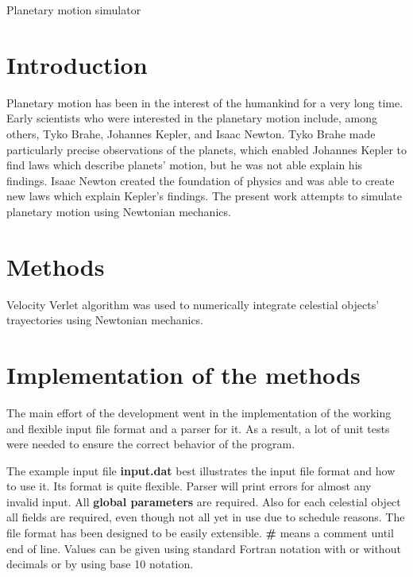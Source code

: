 \documentclass[12pt]{scrartcl}
\begin{document}
\begin{titlepage}
    \vspace*{\fill}
    \begin{center}
        \large
        Planetary motion simulator
        \normalsize
    \end{center}
    \vfill
\end{titlepage}
\date{}

\section*{Introduction}
Planetary motion has been in the interest of the humankind for a very long time. Early scientists who were interested in the planetary motion include, among others, Tyko Brahe, Johannes Kepler, and Isaac Newton. Tyko Brahe made particularly precise observations of the planets, which enabled Johannes Kepler to find laws which describe planets' motion, but he was not able explain his findings. Isaac Newton created the foundation of physics and was able to create new laws which explain Kepler's findings. The present work attempts to simulate planetary motion using Newtonian mechanics.

\section*{Methods}
Velocity Verlet algorithm was used to numerically integrate celestial objects' trayectories using Newtonian mechanics.

\section*{Implementation of the methods}
The main effort of the development went in the implementation of the working and flexible input file format and a parser for it. As a result, a lot of unit tests were needed to ensure the correct behavior of the program.

The example input file \textbf{input.dat} best illustrates the input file format and how to use it. Its format is quite flexible. Parser will print errors for almost any invalid input. All \textbf{global parameters} are required. Also for each celestial object all fields are required, even though not all yet in use due to schedule reasons. The file format has been designed to be easily extensible. \textbf{\#} means a comment until end of line. Values can be given using standard Fortran notation with or without decimals or by using base 10 notation.
\end{document}
